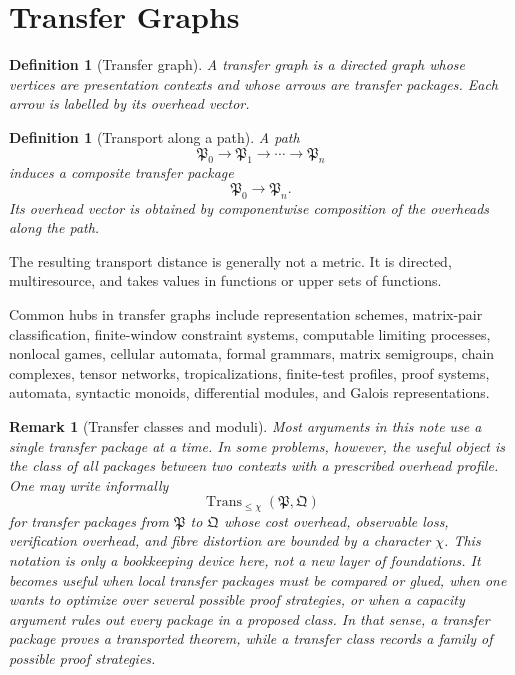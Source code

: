 \documentclass[11pt]{article}
\newtheorem{definition}[theorem]{Definition}
\newtheorem{remark}[theorem]{Remark}
\begin{document}
\section{Transfer Graphs}

\begin{definition}[Transfer graph]
A transfer graph is a directed graph whose vertices are presentation contexts and whose arrows are transfer packages. Each arrow is labelled by its overhead vector.
\end{definition}

\begin{definition}[Transport along a path]
A path
\[
\mathfrak P_0\to\mathfrak P_1\to\cdots\to\mathfrak P_n
\]
induces a composite transfer package
\[
\mathfrak P_0\to\mathfrak P_n.
\]
Its overhead vector is obtained by componentwise composition of the overheads along the path.
\end{definition}

The resulting transport distance is generally not a metric. It is directed, multiresource, and takes values in functions or upper sets of functions.

Common hubs in transfer graphs include representation schemes, matrix-pair classification, finite-window constraint systems, computable limiting processes, nonlocal games, cellular automata, formal grammars, matrix semigroups, chain complexes, tensor networks, tropicalizations, finite-test profiles, proof systems, automata, syntactic monoids, differential modules, and Galois representations.

\begin{remark}[Transfer classes and moduli]
Most arguments in this note use a single transfer package at a time. In some problems, however, the useful object is the class of all packages between two contexts with a prescribed overhead profile. One may write informally
\[
\operatorname{Trans}_{\leq\chi}(\mathfrak P,\mathfrak Q)
\]
for transfer packages from \(\mathfrak P\) to \(\mathfrak Q\) whose cost overhead, observable loss, verification overhead, and fibre distortion are bounded by a character \(\chi\). This notation is only a bookkeeping device here, not a new layer of foundations. It becomes useful when local transfer packages must be compared or glued, when one wants to optimize over several possible proof strategies, or when a capacity argument rules out every package in a proposed class. In that sense, a transfer package proves a transported theorem, while a transfer class records a family of possible proof strategies.
\end{remark}
\end{document}
